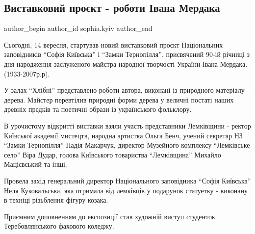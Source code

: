  
 
 
 
 

\subsection{Виставковий проєкт - роботи Івана Мердака}
\label{sec:14_09_2023.fb.sophia.kyiv.1.vystavkovyj_proekt_ivan_merdak}

\ifcmt
 author_begin
   author_id sophia.kyiv
 author_end
\fi

Сьогодні, 14 вересня, стартував новий виставковий проєкт Національних
заповідників \enquote{Софія Київська} і \enquote{Замки Тернопілля}, присвячений 90-ій річниці з
дня народження заслуженого майстра народної творчості України Івана Мердака.
(1933-2007р.р).

У залах \enquote{Хлібні} представлено роботи автора, виконані із природного матеріалу –
дерева. Майстер перевтілив природні форми дерева у величні постаті наших
древніх предків та поетичні образи із українського фольклору. 

В урочистому відкритті виставки взяли участь представники  Лемківщини - ректор
Київської академії мистецтв, народна артистка Ольга Бенч, учений секретар НЗ
\enquote{Замки Тернопілля} Надія Макарчук, директор Музейного комплексу \enquote{Лемківське
село} Віра Дудар, голова Київського товариства \enquote{Лемківщина} Михайло Мацієвський
та інші. 

Провела захід генеральний директор Національного заповідника \enquote{Софія Київська}
Неля Куковальська, яка отримала від лемківців у подарунок статуетку - виконану
в техніці різьблення фігуру козака.

Приємним доповненням до експозиції став художній виступ студенток Теребовлянського фахового коледжу.
